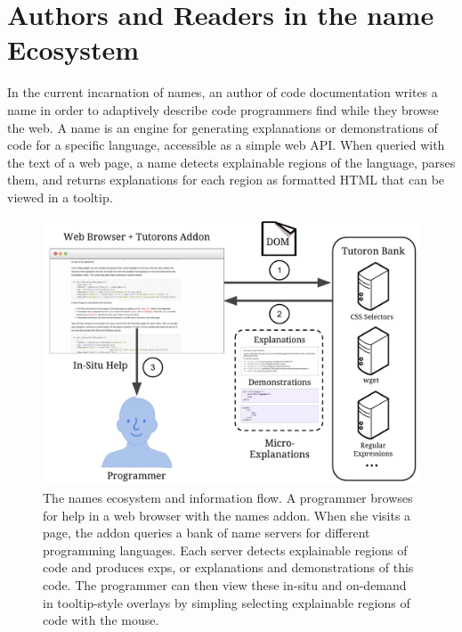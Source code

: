 \section{Authors and Readers in the \Gls{name} Ecosystem}

In the current incarnation of \glspl{name}, an author of code documentation writes a \gls{name} in order to adaptively describe  code programmers find while they browse the web.
A \gls{name} is an engine for generating explanations or demonstrations of code for a specific language, accessible as a simple web API\@.
When queried with the text of a web page, a \gls{name} detects explainable regions of the language, parses them, and returns explanations for each region as formatted HTML that can be viewed in a tooltip.

\begin{figure}
    \includegraphics[width=\columnwidth]{figures/tutoron_ecosystem}
    \caption{%
    The \Glspl{name} ecosystem and information flow.
    A programmer browses for help in a web browser with the \Glspl{name} addon.
    When she visits a page, the addon queries a bank of \gls{name} servers for different programming languages.
    Each server detects explainable regions of code and produces \glspl{exp}, or explanations and demonstrations of this code.
    The programmer can then view these in-situ and on-demand in tooltip-style overlays by simpling selecting explainable regions of code with the mouse.
    }\label{fig:tutoron_ecosystem}
\end{figure}

